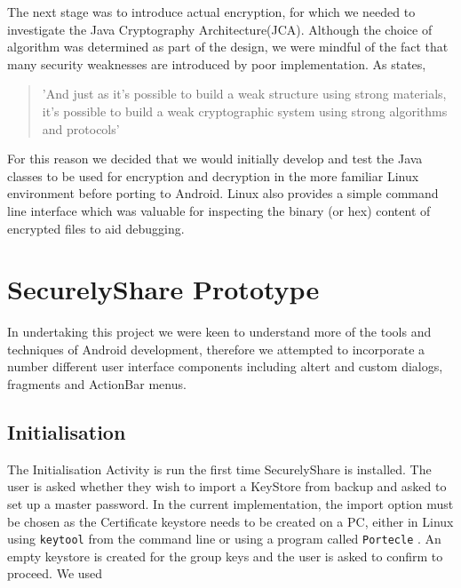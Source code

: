 The next stage was to introduce actual encryption, for which we needed to investigate the Java Cryptography Architecture(JCA).  Although the choice of algorithm was determined as part of the design, we were mindful of the fact that  many security weaknesses are introduced by poor implementation. As \citet{schneier1998security} states,
\begin{quotation}
'And just as it's possible to build a weak structure using strong materials, it's possible to build a weak cryptographic system using strong algorithms and protocols' 
\end{quotation}  
For this reason we decided that we would initially develop and test the  Java classes to be used for encryption and decryption in the more familiar Linux environment before porting to Android.  Linux also provides a simple command line interface which was valuable for inspecting the binary (or hex) content of encrypted files to aid debugging.

\section{SecurelyShare Prototype}
In undertaking this project we were keen to understand more of the tools and techniques of Android development, therefore we attempted to incorporate a number different user interface components including altert and custom dialogs, fragments and ActionBar menus.
\subsection*{Initialisation}

The Initialisation Activity is run the first time SecurelyShare is installed.  The user is asked whether they wish to import a KeyStore from backup and asked to set up a master password.  In the current implementation, the import option must be chosen as the Certificate keystore needs to be created on a PC, either in Linux using  \texttt{keytool} from the command line or using a program called \texttt{Portecle}  \citep{portecle}.  An empty keystore is created for the group keys and the user is asked to confirm to proceed.  We used 

